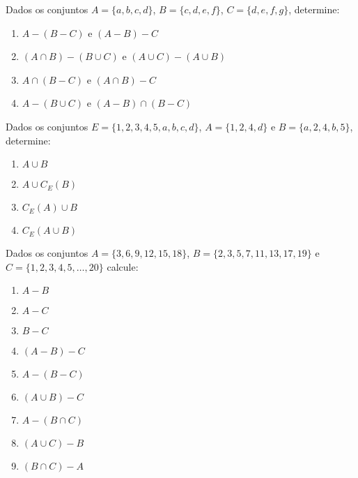 \documentclass[12pt]{exam}
\begin{document}
    \vspace{.3cm}

    \questao{} Dados os conjuntos $A = \{a, b, c, d\}$, $B = \{c, d, e, f\}$, $C = \{d, e, f, g\}$, determine:
    \begin{enumerate}[label={\alph*})]
        \item $A - (B - C)$ e $(A - B) - C$

        \item $(A \cap B) - (B \cup C)$ e $(A \cup C) - (A \cup B)$

        \item $A \cap (B - C)$ e $(A \cap B) - C$

        \item $A - (B \cup C)$ e $(A - B) \cap (B - C)$
    \end{enumerate}

    \questao{} Dados os conjuntos $E = \{1,2,3,4,5,a,b,c,d\}$, $A = \{1,2,4,d\}$ e $B = \{a,2,4,b,5\}$, determine:
    \begin{multicols}{2}
        \begin{enumerate}[label={\alph*})]
            \item $A \cup B$

            \item $A \cup C_E(B)$

            \item $C_E(A) \cup B$

            \item $C_E(A \cup B)$
        \end{enumerate}
    \end{multicols}

    \vspace{.3cm}

    \questao{} Dados os conjuntos $A = \{3,6,9,12,15,18\}$, $B = \{2,3,5,7,11,13,17,19\}$ e $C = \{1,2,3,4,5,\dots,20\}$ calcule:
    \begin{multicols}{3}
        \begin{enumerate}[label={\alph*})]
            \item $A - B$

            \item $A - C$

            \item $B - C$

            \item $(A - B) - C$

            \item $A - (B - C)$

            \item $(A \cup B) - C$

            \item $A - (B \cap C)$

            \item $(A \cup C) - B$

            \item $(B \cap C) - A$
        \end{enumerate}
    \end{multicols}
\end{document}

